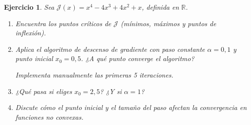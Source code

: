 \documentclass[11pt]{report}
\newtheorem{ex}{Ejercicio}
\begin{document}
\begin{ex}
Sea $\mathcal{J}(x) = x^4 - 4x^3 + 4x^2 + x$, definida en $\mathbb{R}$.

\begin{enumerate}
    \item Encuentra los puntos críticos de $\mathcal{J}$ (mínimos, máximos y puntos de inflexión).
    \item  Aplica el algoritmo de descenso de gradiente con paso constante $\alpha = 0,1$ y punto inicial $x_0 = 0,5$. ¿A qué punto converge el algoritmo?
    
    \emph{Implementa manualmente las primeras 5 iteraciones.}
    
    \item ¿Qué pasa si eliges $x_0 = 2,5$? ¿Y si $\alpha = 1$?

    \item Discute cómo el punto inicial y el tamaño del paso afectan la convergencia en funciones no convexas.

\end{enumerate}
\end{ex}

\end{document}
